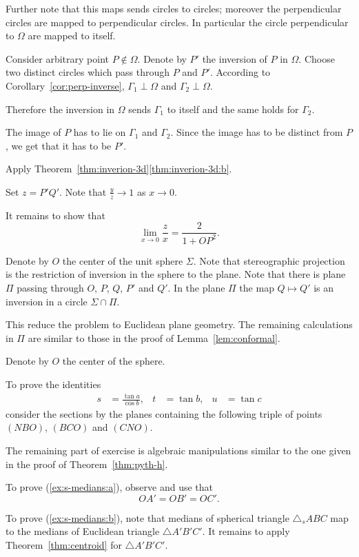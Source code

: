 Further note that this maps sends circles to circles;
moreover the perpendicular circles are mapped to perpendicular circles.
In particular the circle perpendicular to $\Omega$ are mapped to itself.

Consider arbitrary point $P\notin\Omega$.
Denote by $P'$ the inversion of $P$ in $\Omega$.
Choose two distinct circles which pass through $P$ and $P'$.
According to Corollary~\ref{cor:perp-inverse}, 
$\Gamma_1\perp \Omega$ and $\Gamma_2\perp \Omega$.

Therefore the inversion in $\Omega$ sends $\Gamma_1$ to itself and the same holds for $\Gamma_2$. 

The image of $P$ has to lie on $\Gamma_1$ and $\Gamma_2$.
Since the image has to be distinct from $P$, we get that it has to be $P'$.

Apply Theorem~\ref{thm:inverion-3d}\ref{thm:inverion-3d:b}.

Set $z=P'Q'$.
Note that $\tfrac yz\to 1$ as $x\to 0$.

It remains to show that 
$$\lim_{x\to 0} \frac{z}{x}=\frac{2}{1+OP^2}.$$

Denote by $O$ the center of the unit sphere $\Sigma$.
Note that stereographic projection is the restriction of inversion in the sphere to the plane.
Note that there is plane $\Pi$ passing through $O$, $P$, $Q$, $P'$ and $Q'$.
In the plane $\Pi$ the map $Q\mapsto Q'$ is an inversion in a circle $\Sigma\cap \Pi$.

This reduce the problem to Euclidean plane geometry.
The remaining calculations in $\Pi$ are similar to those in the proof of  Lemma~\ref{lem:conformal}.



Denote by $O$ the center of the sphere.

To prove the identities
\begin{align*}
s&=\tfrac{\tan a}{\cos b},
&
t&=\tan b,
&
u&=\tan c
\end{align*}
consider the sections by the planes containing the following triple of points $(NBO)$, $(BCO)$ and $(CNO)$.

The remaining part of exercise is algebraic manipulations similar to the one given in the proof of Theorem~\ref{thm:pyth-h}.

To prove (\ref{ex:s-medians:a}),
observe and use that 
\[OA'=OB'=OC'.\]

To prove (\ref{ex:s-medians:b}), note that medians of spherical triangle $\triangle_s ABC$ 
map to the medians of Euclidean triangle $\triangle A'B'C'$.
It remains to apply Theorem~\ref{thm:centroid} for $\triangle A'B'C'$.


